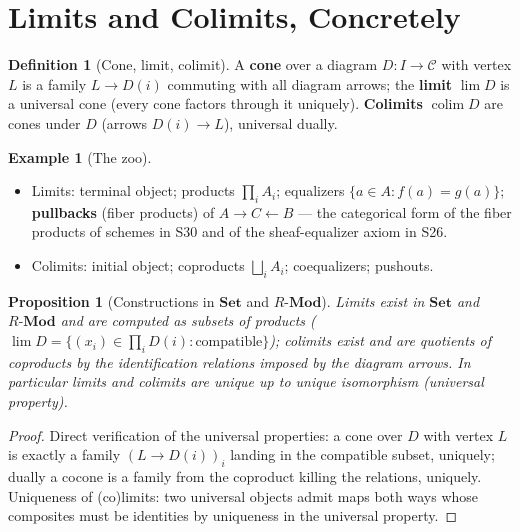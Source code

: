 \documentclass[11pt,a4paper]{article}
\newtheorem{proposition}[theorem]{Proposition}
\theoremstyle{definition}
\newtheorem{definition}[theorem]{Definition}
\newtheorem{example}[theorem]{Example}
\newcommand{\colim}{\operatorname{colim}}
\newcommand{\Set}{\mathbf{Set}}
\begin{document}
\section{Limits and Colimits, Concretely}

\begin{definition}[Cone, limit, colimit]
A \textbf{cone} over a diagram $D:I\to\mathcal C$ with vertex $L$ is a family $L\to D(i)$ commuting
with all diagram arrows; the \textbf{limit} $\lim D$ is a universal cone (every cone factors through
it uniquely). \textbf{Colimits} $\colim D$ are cones under $D$ (arrows $D(i)\to L$), universal dually.
\end{definition}

\begin{example}[The zoo]\label{ex:limzoo}
\begin{itemize}
  \item Limits: terminal object; products $\prod_i A_i$; equalizers
    $\{a\in A:f(a)=g(a)\}$; \textbf{pullbacks} (fiber products) of $A\to C\leftarrow B$ --- the
    categorical form of the fiber products of schemes in S30 and of the sheaf-equalizer axiom in S26.
  \item Colimits: initial object; coproducts $\bigsqcup_i A_i$; coequalizers; pushouts.
\end{itemize}
\end{example}

\begin{proposition}[Constructions in $\Set$ and $R\text{-}\mathbf{Mod}$]\label{prop:limconstr}
Limits exist in $\Set$ and $R\text{-}\mathbf{Mod}$ and are computed as subsets of products
($\lim D=\{(x_i)\in\prod_i D(i):\text{compatible}\}$); colimits exist and are quotients of
coproducts by the identification relations imposed by the diagram arrows. In particular limits and
colimits are unique up to unique isomorphism (universal property).
\end{proposition}
\begin{proof}
Direct verification of the universal properties: a cone over $D$ with vertex $L$ is exactly a family
$(L\to D(i))_i$ landing in the compatible subset, uniquely; dually a cocone is a family from the
coproduct killing the relations, uniquely. Uniqueness of (co)limits: two universal objects admit
maps both ways whose composites must be identities by uniqueness in the universal property.
\end{proof}
\end{document}
